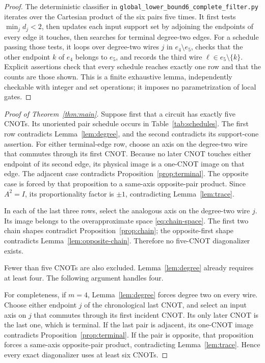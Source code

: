 \documentclass[11pt]{article}
\begin{document}
\begin{proof}
The deterministic classifier in
\texttt{global\_lower\_bound6\_complete\_filter.py} iterates over
the Cartesian product of the six pairs five times.  It first tests
$\min_j d_j<2$, then updates each input support set by adjoining the
endpoints of every edge it touches, then searches for terminal
degree-two edges.  For a schedule passing those tests, it loops over
degree-two wires $j$ in $e_4\setminus e_5$, checks that the other
endpoint $k$ of $e_4$ belongs to $e_5$, and records the third wire
$\ell\in e_5\setminus\{k\}$.  Explicit assertions check that every
schedule reaches exactly one row and that the counts are those shown.
This is a finite exhaustive lemma, independently checkable with integer
and set operations; it imposes no parametrization of local gates.
\end{proof}

\begin{proof}[Proof of Theorem~\ref{thm:main}]
Suppose first that a circuit has exactly five CNOTs.  Its unoriented
pair schedule occurs in Table~\ref{tab:schedules}.  The first row
contradicts Lemma~\ref{lem:degree}, and the second contradicts its
support-cone assertion.  For either terminal-edge row, choose an axis on
the degree-two wire that commutes through its first CNOT.  Because no
later CNOT touches either endpoint of its second edge, its physical
image is a one-CNOT image on that edge.  The adjacent case contradicts
Proposition~\ref{prop:terminal}.  The opposite case is forced by that
proposition to a same-axis opposite-pair product. Since $A^2=I$,
its proportionality factor is $\pm1$, contradicting
Lemma~\ref{lem:trace}.

In each of the last three rows, select the analogous axis on the
degree-two wire $j$.  Its image belongs to the overapproximate space
\eqref{eq:chain-space}.  The first two chain shapes contradict
Proposition~\ref{prop:chain}; the opposite-first shape contradicts
Lemma~\ref{lem:opposite-chain}.  Therefore no five-CNOT diagonalizer
exists.

Fewer than five CNOTs are also excluded.  Lemma~\ref{lem:degree}
already requires at least four.  The following argument handles four.

For completeness, if $m=4$, Lemma~\ref{lem:degree} forces degree two
on every wire.  Choose either endpoint $j$ of the chronological last
CNOT, and select an input axis on $j$ that commutes through its first
incident CNOT.  Its only later CNOT is the last one, which is terminal.
If the last pair is adjacent, its one-CNOT image contradicts
Proposition~\ref{prop:terminal}.  If the pair is opposite, that
proposition forces a same-axis opposite-pair product, contradicting
Lemma~\ref{lem:trace}.  Hence every exact diagonalizer uses at least
six CNOTs.
\end{proof}
\end{document}
